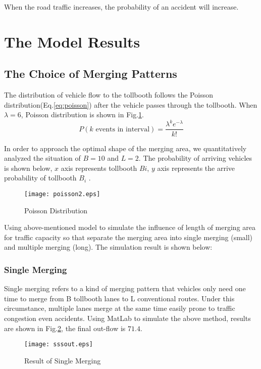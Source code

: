 \documentclass{mcmthesis}
\begin{document}
When the road traffic increases, the probability of an accident will increase.

\section{The Model Results}
\subsection{The Choice of Merging Patterns}
The distribution of vehicle flow to the tollbooth follows the Poisson distribution(Eq.\ref*{eq:poisson})  after the vehicle passes through the tollbooth. 
When$\lambda = 6$, Poisson distribution is shown in Fig.\ref{fig:poisson}.
\begin{equation}
	\label{eq:poisson}
	P(k \text{ events in interval})=\frac{\lambda^{k} e^{-\lambda}}{k!}
\end{equation}

In order to approach the optimal shape of the merging area, we quantitatively analyzed the situation of $B = 10$ and $L = 2$. The probability of arriving vehicles is shown below, $x$ axis represents tollbooth $Bi$, $y$ axis represents the arrive probability of tollbooth $B_i$ .

\begin{figure}[!htbp]
	\small
	\centering
	\texttt{[image: poisson2.eps]}
	\caption{\label{fig:poisson}Poisson Distribution} 
\end{figure}

Using above-mentioned model to simulate the influence of length of merging area for traffic capacity so that separate the merging area into single merging (small) and  multiple merging (long). The simulation result is shown below: 
\subsubsection{Single Merging}
Single merging refers to a kind of merging pattern that vehicles only need one time to merge from B tollbooth lanes to L conventional routes. Under this circumstance, multiple lanes merge at the same time easily prone to traffic congestion even accidents. Using  MatLab to simulate the above method, results are shown in Fig.\ref{fig:direct_out}, the final out-flow is $71.4$.
\begin{figure}[!htbp]
	\small
	\centering
	\texttt{[image: sssout.eps]}
	\caption{\label{fig:direct_out}Result of Single Merging} 
\end{figure}
\end{document}
